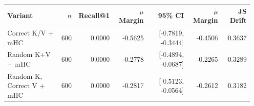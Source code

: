 \begin{tabular}{l r r r r r r}
\toprule
Variant & $n$ & Recall@1 & $\mu$ Margin & 95\% CI & $\tilde{\mu}$ Margin & JS Drift \\
\midrule
Correct K/V + mHC & 600 & 0.0000 & -0.5625 & [-0.7819, -0.3444] & -0.4506 & 0.3637 \\
Random K+V + mHC & 600 & 0.0000 & -0.2778 & [-0.4894, -0.0687] & -0.2265 & 0.3289 \\
Random K, Correct V + mHC & 600 & 0.0000 & -0.2817 & [-0.5123, -0.0564] & -0.2612 & 0.3182 \\
\bottomrule
\end{tabular}
